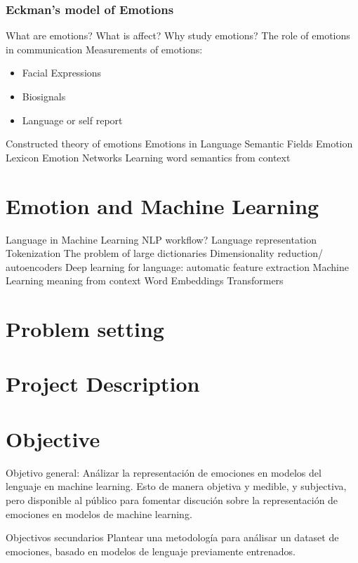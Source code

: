 \subsubsection{Eckman's model of Emotions}\label{subs:Eckman's model of Emotions}

What are emotions?
What is affect?
Why study emotions?
The role of emotions in communication
Measurements of emotions:
\begin{itemize}
  \item Facial Expressions
  \item Biosignals
  \item Language or self report
\end{itemize}

Constructed theory of emotions
Emotions in Language
Semantic Fields
Emotion Lexicon
Emotion Networks
Learning word semantics from context

\section{Emotion and Machine Learning}\label{sec:Emotion and Machine Learning}
Language in Machine Learning
NLP workflow?
Language representation
Tokenization
The problem of large dictionaries
Dimensionality reduction/ autoencoders
Deep learning for language: automatic feature extraction
Machine Learning meaning from context
Word Embeddings
Transformers

\section{Problem setting}\label{sec:Problem setting}


\section{Project Description}\label{sec:Project Description}


\section{Objective}\label{sec:Objective}

Objetivo general:
Análizar la representación de emociones en modelos del lenguaje en machine learning. Esto de manera objetiva y medible, y subjectiva, pero disponible al público para fomentar discución sobre la representación de emociones en modelos de machine learning.

Objectivos secundarios
Plantear una metodología para análisar un dataset de emociones, basado en modelos de lenguaje previamente entrenados.

